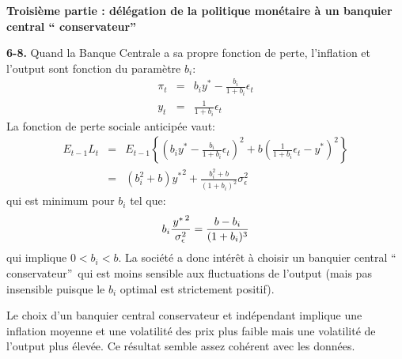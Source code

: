 \documentclass[11pt,a4paper]{article}
\begin{document}
\bigskip

\noindent \textbf{Troisi\`{e}me partie : d\'{e}l\'{e}gation de la politique
mon\'{e}taire \`{a} un banquier central \textquotedblleft
conservateur\textquotedblright }

\smallskip \noindent \textbf{6-8.} Quand la Banque Centrale a sa propre
fonction de perte, l'inflation et l'output sont fonction du param\`{e}tre $%
b_{i}$: 
\begin{eqnarray*}
\pi _{t} &=&b_{i}y^{\ast }-\frac{b_{i}}{1+b_{i}}\epsilon _{t} \\
y_{t} &=&\frac{1}{1+b_{i}}\epsilon _{t}
\end{eqnarray*}%
La fonction de perte sociale anticip\'{e}e vaut: 
\begin{eqnarray*}
E_{t-1}L_{t} &=&E_{t-1}\left\{ \left( b_{i}y^{\ast }-\frac{b_{i}}{1+b_{i}}%
\epsilon _{t}\right) ^{2}+b\left( \frac{1}{1+b_{i}}\epsilon _{t}-y^{\ast
}\right) ^{2}\right\} \\
&=&(b_{i}^{2}+b)\left. y^{\ast }\right. ^{2}+\frac{b_{i}^{2}+b}{(1+b_{i})^{2}%
}\sigma _{\epsilon }^{2}
\end{eqnarray*}%
qui est minimum pour $b_{i}$ tel que: 
\begin{equation*}
b_{i}\frac{\left. y^{\ast }\right. ^{2}}{\sigma _{\epsilon }^{2}}=\frac{%
b-b_{i}}{(1+b_{i})^{3}}
\end{equation*}%
qui implique $0<b_{i}<b$. La soci\'{e}t\'{e} a donc int\'{e}r\^{e}t \`{a}
choisir un banquier central \textquotedblleft
conservateur\textquotedblright\ qui est moins sensible aux fluctuations de
l'output (mais pas insensible puisque le $b_{i}$ optimal est strictement
positif).

\noindent Le choix d'un banquier central conservateur et ind\'{e}pendant
implique une inflation moyenne et une volatilit\'{e} des prix plus faible
mais une volatilit\'{e} de l'output plus \'{e}lev\'{e}e. Ce r\'{e}sultat
semble assez coh\'{e}rent avec les donn\'{e}es.
\end{document}
